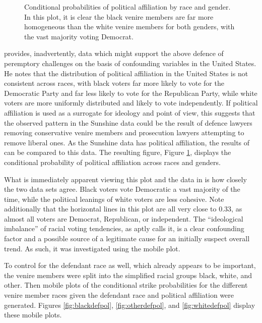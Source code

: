 \begin{figure}[h!]
  \centering
  \caption[Political Affiliation by Race and Gender (Sunshine)]
  {\footnotesize Conditional probabilities of political affiliation by race and gender. In this plot, it is clear the black venire
    members are far more homogeneous than the white venire members for both genders, with the vast majority voting Democrat.} 
  \label{fig:racepolit}
\end{figure}

\cite{revesz2016} provides, inadvertently, data which might support the above defence of peremptory challenges on the basis of
confounding variables in the United States. He notes that the distribution of political affiliation in the United States is not
consistent across races, with black voters far more likely to vote for the Democratic Party and far less likely to vote for the
Republican Party, while white voters are more uniformly distributed and likely to vote independently. If political affiliation is
used as a surrogate for ideology and point of view, this suggests that the observed pattern in the Sunshine data could be the
result of defence lawyers removing conservative venire members and prosecution lawyers attempting to remove liberal ones. As the
Sunshine data has political affiliation, the results of \citeauthor{revesz2016} can be compared to this data. The resulting
figure, Figure \ref{fig:racepolit}, displays the conditional probability of political affiliation across races and genders.

What is immediately apparent viewing this plot and the data in \cite{revesz2016} is how closely the two data sets agree. Black
voters vote Democratic a vast majority of the time, while the political leanings of white voters are less cohesive. Note
additionally that the horizontal lines in this plot are all very close to 0.33, as almost all voters are Democrat, Republican, or
independent. The ``ideological imbalance'' of racial voting tendencies, as \citeauthor{revesz2016} aptly calls it, is a clear
confounding factor and a possible source of a legitimate cause for an initially suspect overall trend. As such, it was
investigated using the mobile plot.

To control for the defendant race as well, which already appears to be important, the venire members were split into the
simplified racial groups black, white, and other. Then mobile plots of the conditional strike probabilities for the different
venire member races given the defendant race and political affiliation were generated. Figures \ref{fig:blackdefpol},
\ref{fig:otherdefpol}, and \ref{fig:whitedefpol} display these mobile plots.

